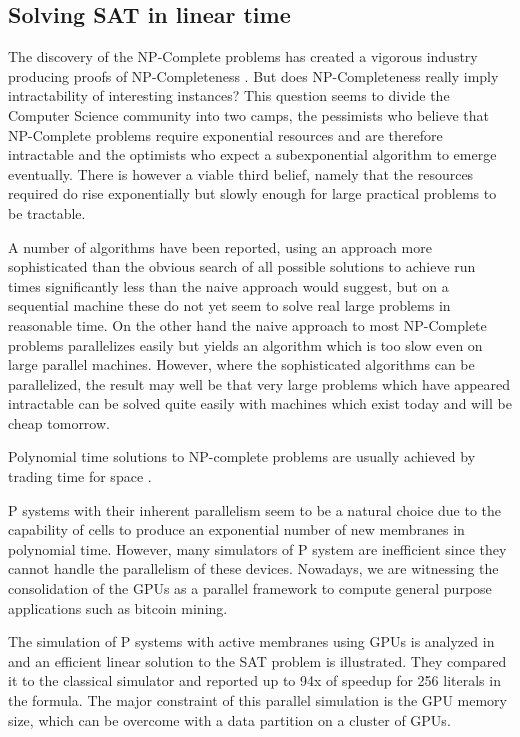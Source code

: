 
\subsection{Solving SAT in linear time} %
\label{sub:solving_sat_in_linear_time}

The discovery of the NP-Complete problems has created a vigorous industry producing proofs of NP-Completeness \cite{NPCompleteness}. But does NP-Completeness really imply intractability of interesting instances? This question seems to divide the Computer Science community into two camps, the pessimists who believe that NP-Complete problems require exponential resources and are therefore intractable and the optimists who expect a subexponential algorithm to emerge eventually. There is however a viable third belief, namely that the resources required do rise exponentially but slowly enough for large practical problems to be tractable.

A number of algorithms have been reported, using an approach more sophisticated than the obvious search of all possible solutions to achieve run times significantly less than the naive approach would suggest, but on a sequential machine these do not yet seem to solve real large problems in reasonable time. On the other hand the naive approach to most NP-Complete problems parallelizes easily but yields an algorithm which is too slow even on large parallel machines. However, where the sophisticated algorithms can be parallelized, the result may well be that very large problems which have appeared intractable can be solved quite easily with machines which exist today and will be cheap tomorrow.

Polynomial time solutions to NP-complete problems are usually achieved by trading time for space \cite{Stamp03TimeMemoryTradeoff}.

P systems with their inherent parallelism seem to be a natural choice due to the capability of cells to produce an exponential number of new membranes in polynomial time. However, many simulators of P system are inefficient since they cannot handle the parallelism of these devices. Nowadays, we are witnessing the consolidation of the GPUs as a parallel framework to compute general purpose applications such as bitcoin mining.

The simulation of P systems with active membranes using GPUs is analyzed in \cite{Cecilia10SAT} and an efficient linear solution to the SAT problem is illustrated. They compared it to the classical simulator and reported up to 94x of speedup for 256 literals in the formula. The major constraint of this parallel simulation is the GPU memory size, which can be overcome with a data partition on a cluster of GPUs.

